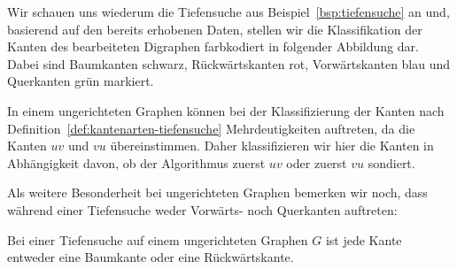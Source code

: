 \begin{bsp} 
Wir schauen uns wiederum die Tiefensuche aus Beispiel~\ref{bsp:tiefensuche} an und, basierend auf den bereits erhobenen Daten, stellen wir die Klassifikation der Kanten des bearbeiteten Digraphen farbkodiert in folgender Abbildung dar.
Dabei sind Baumkanten schwarz, Rückwärtskanten rot, Vorwärtskanten blau und Querkanten grün markiert.

\begin{center} 
\end{center} 
\end{bsp} 

\begin{bem} 
In einem ungerichteten Graphen können bei der Klassifizierung der Kanten nach Definition~\ref{def:kantenarten-tiefensuche} Mehrdeutigkeiten auftreten, da die Kanten $uv$ und $vu$ übereinstimmen.
Daher klassifizieren wir hier die Kanten in Abhängigkeit davon, ob der Algorithmus zuerst $uv$ oder zuerst $vu$ sondiert. 

Als weitere Besonderheit bei ungerichteten Graphen bemerken wir noch, dass während einer Tiefensuche weder Vorwärts- noch Querkanten auftreten:
\end{bem} 

\begin{thm}
Bei einer Tiefensuche auf einem ungerichteten Graphen $G$ ist jede Kante entweder eine Baumkante oder eine Rückwärtskante.
\end{thm}

